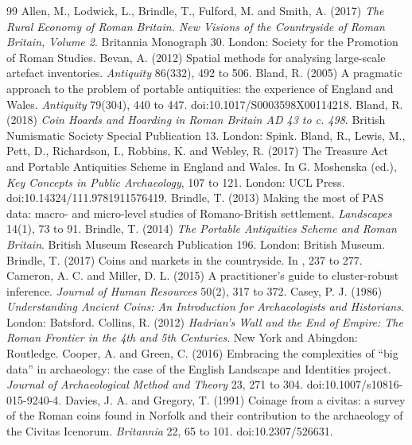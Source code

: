\documentclass[11pt,a4paper]{article}
\begin{document}
\begin{thebibliography}{99}
 Allen, M., Lodwick, L., Brindle, T., Fulford, M. and Smith, A. (2017) \textit{The Rural Economy of Roman Britain. New Visions of the Countryside of Roman Britain, Volume 2}. Britannia Monograph 30. London: Society for the Promotion of Roman Studies.
 Bevan, A. (2012) Spatial methods for analysing large-scale artefact inventories. \textit{Antiquity} 86(332), 492 to 506.
 Bland, R. (2005) A pragmatic approach to the problem of portable antiquities: the experience of England and Wales. \textit{Antiquity} 79(304), 440 to 447. doi:10.1017/S0003598X00114218.
 Bland, R. (2018) \textit{Coin Hoards and Hoarding in Roman Britain AD 43 to c. 498}. British Numismatic Society Special Publication 13. London: Spink.
 Bland, R., Lewis, M., Pett, D., Richardson, I., Robbins, K. and Webley, R. (2017) The Treasure Act and Portable Antiquities Scheme in England and Wales. In G. Moshenska (ed.), \textit{Key Concepts in Public Archaeology}, 107 to 121. London: UCL Press. doi:10.14324/111.9781911576419.
 Brindle, T. (2013) Making the most of PAS data: macro- and micro-level studies of Romano-British settlement. \textit{Landscapes} 14(1), 73 to 91.
 Brindle, T. (2014) \textit{The Portable Antiquities Scheme and Roman Britain}. British Museum Research Publication 196. London: British Museum.
 Brindle, T. (2017) Coins and markets in the countryside. In \citet{allen2017}, 237 to 277.
 Cameron, A. C. and Miller, D. L. (2015) A practitioner's guide to cluster-robust inference. \textit{Journal of Human Resources} 50(2), 317 to 372.
 Casey, P. J. (1986) \textit{Understanding Ancient Coins: An Introduction for Archaeologists and Historians}. London: Batsford.
 Collins, R. (2012) \textit{Hadrian's Wall and the End of Empire: The Roman Frontier in the 4th and 5th Centuries}. New York and Abingdon: Routledge.
 Cooper, A. and Green, C. (2016) Embracing the complexities of ``big data'' in archaeology: the case of the English Landscape and Identities project. \textit{Journal of Archaeological Method and Theory} 23, 271 to 304. doi:10.1007/s10816-015-9240-4.
 Davies, J. A. and Gregory, T. (1991) Coinage from a civitas: a survey of the Roman coins found in Norfolk and their contribution to the archaeology of the Civitas Icenorum. \textit{Britannia} 22, 65 to 101. doi:10.2307/526631.

\end{thebibliography}
\end{document}
